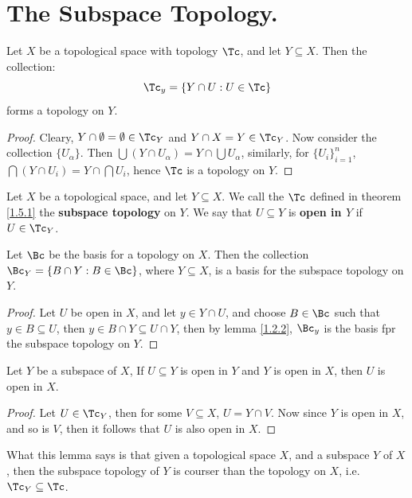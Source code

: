 
\section{The Subspace Topology.}

\begin{theorem}\label{1.5.1}
    Let $X$ be a topological space with topology $\Tc$, and let $Y \subseteq X$. Then the
    collection:
        \begin{equation*}
            \Tc_y = \{Y \cap U: U \in \Tc\}
        \end{equation*}
    forms a topology on $Y$.
\end{theorem}
\begin{proof}
    Cleary, $Y \cap \emptyset=\emptyset \in \Tc_Y$ and  $Y \cap X=Y \in \Tc_Y$. Now  consider the collection
    $\{U_{\alpha}\}$. Then  $\bigcup{(Y \cap U_{\alpha})}=Y \cap \bigcup{U_{\alpha}}$, similarly, for  $\{U_i\}_{i=1}^n$,
    $\bigcap{(Y \cap U_i)}=Y \cap \bigcap{U_i}$, hence  $\Tc$ is a topology on  $Y$.
\end{proof}

\begin{definition}
    Let $X$ be a topological space, and let  $Y \subseteq X$. We call the $\Tc$ defined
    in theorem \ref{1.5.1} the \textbf{subspace topology} on $Y$. We say that $U \subseteq Y$ is
    \textbf{open in $Y$} if $U \in \Tc_Y$.
\end{definition}

\begin{lemma}\label{1.5.2}
    Let $\Bc$ be the basis for a topology on  $X$. Then the collection  $\Bc_Y=\{B \cap Y: B \in \Bc\}$,
    where  $Y \subseteq X$, is a basis for the subspace topology on  $Y$.
\end{lemma}
\begin{proof}
    Let $U$ be open in  $X$, and let  $y \in Y \cap U$, and choose  $B \in \Bc$ such that
    $y \in B \subseteq U$, then  $y \in B \cap Y \subseteq U \cap Y$, then by lemma \ref{1.2.2},
     $\Bc_y$ is the basis fpr the subspace topology on  $Y$.
\end{proof}

\begin{lemma}\label{1.5.3}
    Let $Y$ be a subspace of  $X$, If  $U \subseteq Y$ is open in  $Y$ and $Y$
    is open in  $X$, then  $U$ is open in  $X$.
\end{lemma}
\begin{proof}
    Let $U \in \Tc_Y$, then for some  $V \subseteq X$,  $U=Y \cap V$. Now since  $Y$ is open in  $X$, and so
    is  $V$, then  it follows that $U$ is also open in  $X$.
\end{proof}
\begin{remark}
    What this lemma says is that given a topological space $X$, and a subspace  $Y$ of  $X$, then the
    subspace topology of  $Y$ is courser than the topology on  $X$, i.e.  $\Tc_Y \subseteq \Tc$.
\end{remark}


